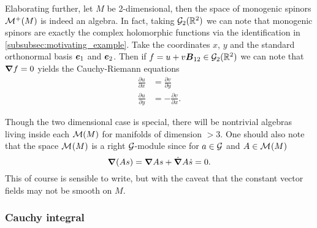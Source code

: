 Elaborating further, let $M$ be 2-dimensional, then the space of monogenic spinors $\mathcal{M}^+(M)$ is indeed an algebra. In fact, taking $\mathcal{G}_2(\mathbb{R}^2)$ we can note that monogenic spinors are exactly the complex holomorphic functions via the identification in \cref{subsubsec:motivating_example}. Take the coordinates $x$, $y$ and the standard orthonormal basis $\boldsymbol{e}_1$ and $\boldsymbol{e}_2$. Then if $f=u+v\boldsymbol{B}_{12} \in \mathcal{G}_2(\mathbb{R}^2)$ we can note that $\boldsymbol{\nabla} f =0$ yields the Cauchy-Riemann equations
\begin{align}
\label{eq:cauchy_riemann_equations}
    \frac{\partial u}{\partial x} &= \frac{\partial v}{\partial y}\\
    \frac{\partial u}{\partial y} &= -\frac{\partial v}{\partial x}.
\end{align}

Though the two dimensional case is special, there will be nontrivial algebras living inside each $\mathcal{M}(M)$ for manifolds of dimension $>3$. One should also note that the space $\mathcal{M}^{}(M)$ is a right $\mathcal{G}$-module since for $a\in \mathcal{G}$ and $A\in \mathcal{M}^{}(M)$
\begin{equation}
\boldsymbol{\nabla}(As) = \boldsymbol{\nabla} A s + \dot{\boldsymbol{\nabla}}A \dot{s} = 0.
\end{equation}
This of course is sensible to write, but with the caveat that the constant vector fields may not be smooth on $M$.

\subsubsection{Cauchy integral}


